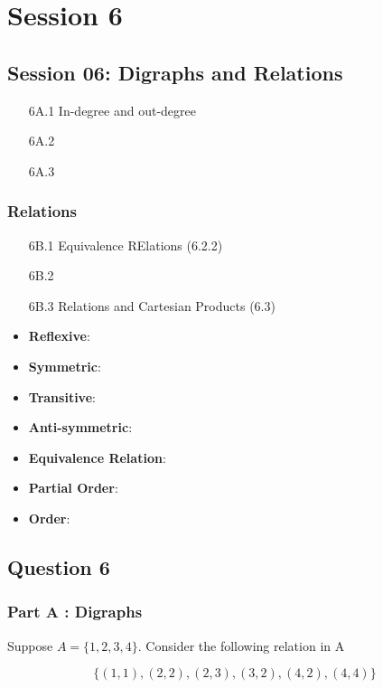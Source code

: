 \chapter{Session 6}
\section*{Session 06: Digraphs and Relations}
\begin{itemize}
\item[6A.1] In-degree and out-degree
\item[6A.2]
\item[6A.3]
\end{itemize}
\subsection*{Relations}
\begin{itemize}
\item[6B.1] Equivalence RElations (6.2.2)
\item[6B.2]
\item[6B.3] Relations and Cartesian Products (6.3)
\end{itemize}


\begin{itemize}
\item \textbf{Reflexive}: 
\item \textbf{Symmetric}: 
\item \textbf{Transitive}: 
\item \textbf{Anti-symmetric}: 
\item \textbf{Equivalence Relation}: 
\item \textbf{Partial Order}:
\item \textbf{Order}:
\end{itemize}

\section*{Question 6}

\subsection*{Part A : Digraphs}

Suppose $A = \{1,2,3,4\}$. Consider the following relation in A

\[ \{  (1,1),(2,2),(2,3),(3,2),(4,2),(4,4)\} \]

